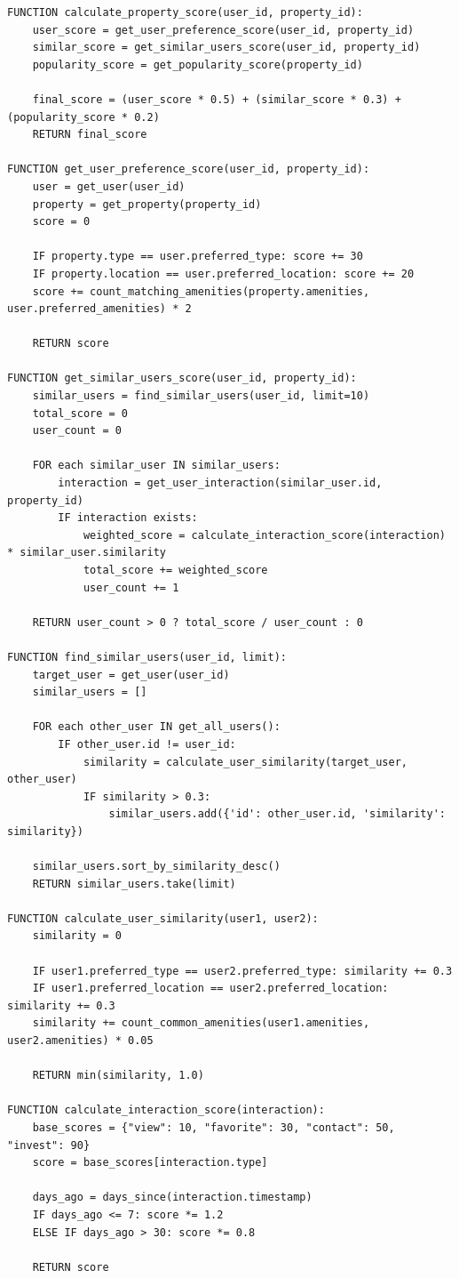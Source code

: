 \begin{verbatim}
FUNCTION calculate_property_score(user_id, property_id):
    user_score = get_user_preference_score(user_id, property_id)
    similar_score = get_similar_users_score(user_id, property_id)
    popularity_score = get_popularity_score(property_id)
    
    final_score = (user_score * 0.5) + (similar_score * 0.3) + (popularity_score * 0.2)
    RETURN final_score

FUNCTION get_user_preference_score(user_id, property_id):
    user = get_user(user_id)
    property = get_property(property_id)
    score = 0
    
    IF property.type == user.preferred_type: score += 30
    IF property.location == user.preferred_location: score += 20
    score += count_matching_amenities(property.amenities, user.preferred_amenities) * 2
    
    RETURN score

FUNCTION get_similar_users_score(user_id, property_id):
    similar_users = find_similar_users(user_id, limit=10)
    total_score = 0
    user_count = 0
    
    FOR each similar_user IN similar_users:
        interaction = get_user_interaction(similar_user.id, property_id)
        IF interaction exists:
            weighted_score = calculate_interaction_score(interaction) * similar_user.similarity
            total_score += weighted_score
            user_count += 1
    
    RETURN user_count > 0 ? total_score / user_count : 0

FUNCTION find_similar_users(user_id, limit):
    target_user = get_user(user_id)
    similar_users = []
    
    FOR each other_user IN get_all_users():
        IF other_user.id != user_id:
            similarity = calculate_user_similarity(target_user, other_user)
            IF similarity > 0.3:
                similar_users.add({'id': other_user.id, 'similarity': similarity})
    
    similar_users.sort_by_similarity_desc()
    RETURN similar_users.take(limit)

FUNCTION calculate_user_similarity(user1, user2):
    similarity = 0
    
    IF user1.preferred_type == user2.preferred_type: similarity += 0.3
    IF user1.preferred_location == user2.preferred_location: similarity += 0.3
    similarity += count_common_amenities(user1.amenities, user2.amenities) * 0.05
    
    RETURN min(similarity, 1.0)

FUNCTION calculate_interaction_score(interaction):
    base_scores = {"view": 10, "favorite": 30, "contact": 50, "invest": 90}
    score = base_scores[interaction.type]
    
    days_ago = days_since(interaction.timestamp)
    IF days_ago <= 7: score *= 1.2
    ELSE IF days_ago > 30: score *= 0.8
    
    RETURN score

\end{verbatim}



